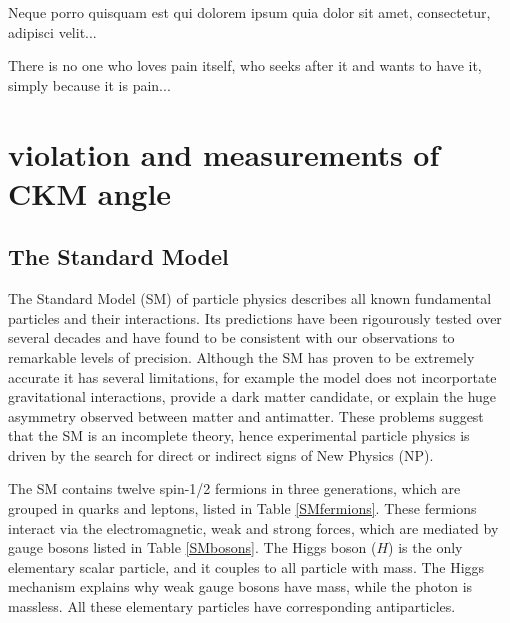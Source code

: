 \begin{savequote}[8cm]
\textlatin{Neque porro quisquam est qui dolorem ipsum quia dolor sit amet, consectetur, adipisci velit...}

There is no one who loves pain itself, who seeks after it and wants to have it, simply because it is pain...
\end{savequote}

\chapter{\label{ch:2-background}\CP violation and measurements of CKM angle \Pgamma} 

\minitoc

\section{The Standard Model}

The Standard Model (SM) of particle physics describes all known fundamental particles and their interactions. Its predictions have been rigourously tested over several decades and have found to be consistent with our observations to remarkable levels of precision. Although the SM has proven to be extremely accurate it has several limitations, for example the model does not incorportate gravitational interactions, provide a dark matter candidate, or explain the huge asymmetry observed between matter and antimatter. These problems suggest that the SM is an incomplete theory, hence experimental particle physics is driven by the search for direct or indirect signs of New Physics (NP).

The SM contains twelve spin-1/2 fermions in three generations, which are grouped in quarks and leptons, listed in Table \ref{SMfermions}. These fermions interact via the electromagnetic, weak and strong forces, which are mediated by gauge bosons listed in Table \ref{SMbosons}. The Higgs boson ($H$) is the only elementary scalar particle, and it couples to all particle with mass. The Higgs mechanism explains why weak gauge bosons have mass, while the photon is massless. All these elementary particles have corresponding antiparticles. 

